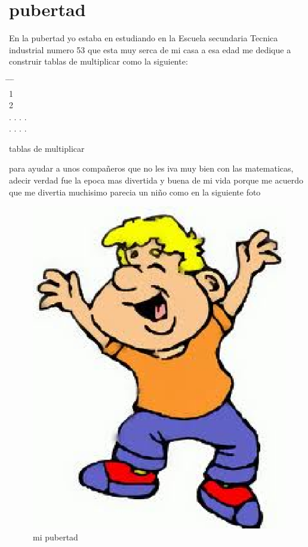 \chapter{pubertad}
En la pubertad yo estaba en estudiando en la Escuela secundaria Tecnica industrial numero 53 que esta muy serca de mi casa
a esa edad me dedique a construir tablas de multiplicar como la siguiente:
\begin{table}
	\begin{tabbing}
	\hspace*{3cm} \= \hspace*{3cm} \= \hspace*{3cm} \= \hspace*{3cm}  \kill
	   \\
	1  \\
	2  \\
	.\> . \> . \> .\\
	.\> . \> . \> .\\
	\end{tabbing}
	\caption{tablas de multiplicar}
	\label{tabla_de_multiplicar.com}
\end{table}

para ayudar a unos compañeros que no les iva muy bien con las matematicas, adecir verdad fue la epoca mas divertida y buena de mi vida
porque me acuerdo que me divertia muchisimo parecia un niño como en la siguiente foto 

\begin{figure}[H]
\centering
\includegraphics{fourChapter/feliz.eps}
\caption{mi pubertad}
\label{pubertad}
\end{figure}

